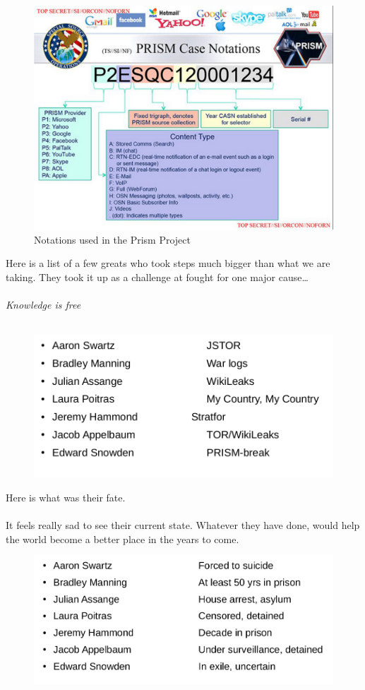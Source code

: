 \documentclass[11pt]{book}
\begin{document}
\begin{figure}[ht!]
	\centering
	\includegraphics[width=150mm]{prism2.png}
	\caption{Notations used in the Prism Project}
	\label{overflow}
\end{figure}
\newpage
Here is a list of a few greats who took steps much bigger than what we are taking. 
They took it up as a challenge at fought for one major cause\ldots
\\\\\emph{Knowledge is free}\\\\
\begin{figure}[ht!]
	\centering
	\includegraphics[width=150mm]{prism3.png}
	\label{overflow}
\end{figure}
\newpage
Here is what was their fate. \\\\ It feels really sad to see their current state. Whatever they have done, would help the world become a better place in the years to come. 
\begin{figure}[ht!]
	\centering
	\includegraphics[width=150mm]{prism4.png}
	\label{overflow}
\end{figure}
\end{document}
